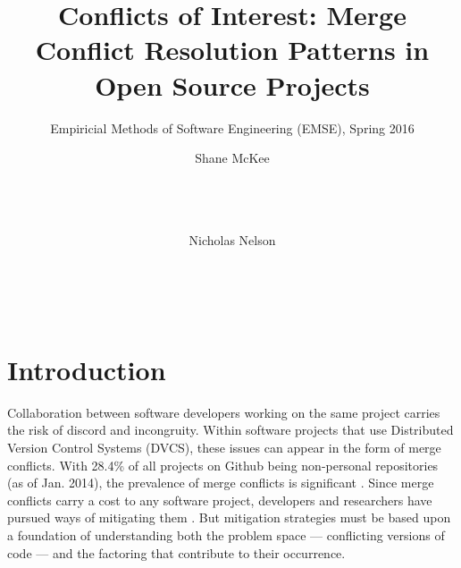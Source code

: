 \documentclass{sig-alternate-05-2015}
\begin{document}





\title{Conflicts of Interest: Merge Conflict Resolution Patterns in Open Source Projects}
\subtitle{Empiricial Methods of Software Engineering (EMSE), Spring 2016}


\author{
\alignauthor
	Shane McKee\\
       	\\
       	\\
       	\\
\and
\alignauthor
Nicholas Nelson\\
       \\
       \\
       \\
}


\maketitle
\section{Introduction}\label{Introduction}
Collaboration between software developers working on the same project carries the risk of discord and incongruity. Within software projects that use Distributed Version Control Systems (DVCS), these issues can appear in the form of merge conflicts. With 28.4\% of all projects on Github being non-personal repositories (as of Jan. 2014), the prevalence of merge conflicts is significant \cite{kalliamvakou14}. Since merge conflicts carry a cost to any software project, developers and researchers have pursued ways of mitigating them \cite{niu2012}. But mitigation strategies must be based upon a foundation of understanding both the problem space --- conflicting versions of code --- and the factoring that contribute to their occurrence.
\end{document}
